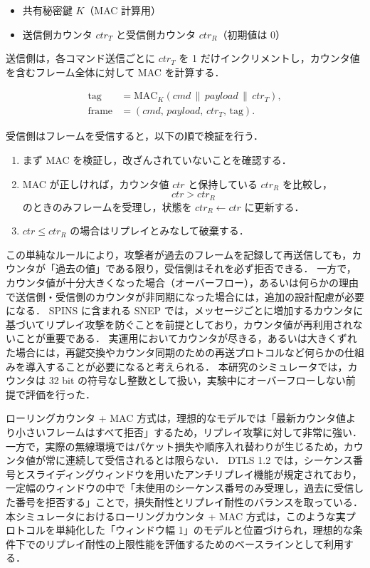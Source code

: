 \documentclass[twocolumn,10pt,a4paper]{jsarticle}
\begin{document}
\begin{itemize}
 \item 共有秘密鍵 $K$（MAC 計算用）
 \item 送信側カウンタ $ctr_T$ と受信側カウンタ $ctr_R$（初期値は 0）
\end{itemize}

送信側は，各コマンド送信ごとに $ctr_T$ を 1 だけインクリメントし，カウンタ値を含むフレーム全体に対して MAC を計算する．

\[
\begin{aligned}
\mathrm{tag} &= \mathrm{MAC}_K(\mathit{cmd} \,\|\, \mathit{payload} \,\|\, ctr_T),\\
\mathrm{frame} &= (\mathit{cmd},\, \mathit{payload},\, ctr_T,\, \mathrm{tag}).
\end{aligned}
\]

受信側はフレームを受信すると，以下の順で検証を行う．

\begin{enumerate}
 \item まず MAC を検証し，改ざんされていないことを確認する．
 \item MAC が正しければ，カウンタ値 $ctr$ と保持している $ctr_R$ を比較し，
       \[
          ctr > ctr_R
       \]
       のときのみフレームを受理し，状態を $ctr_R \leftarrow ctr$ に更新する．
 \item $ctr \le ctr_R$ の場合はリプレイとみなして破棄する．
\end{enumerate}

この単純なルールにより，攻撃者が過去のフレームを記録して再送信しても，カウンタが「過去の値」である限り，受信側はそれを必ず拒否できる．
一方で，カウンタ値が十分大きくなった場合（オーバーフロー），あるいは何らかの理由で送信側・受信側のカウンタが非同期になった場合には，追加の設計配慮が必要になる．
SPINS に含まれる SNEP では，メッセージごとに増加するカウンタに基づいてリプレイ攻撃を防ぐことを前提としており，カウンタ値が再利用されないことが重要である\cite{PerrigSPINS}．
実運用においてカウンタが尽きる，あるいは大きくずれた場合には，再鍵交換やカウンタ同期のための再送プロトコルなど何らかの仕組みを導入することが必要になると考えられる．
本研究のシミュレータでは，カウンタは 32 bit の符号なし整数として扱い，実験中にオーバーフローしない前提で評価を行った．

ローリングカウンタ + MAC 方式は，理想的なモデルでは「最新カウンタ値より小さいフレームはすべて拒否」するため，リプレイ攻撃に対して非常に強い．
一方で，実際の無線環境ではパケット損失や順序入れ替わりが生じるため，カウンタ値が常に連続して受信されるとは限らない．
DTLS 1.2 では，シーケンス番号とスライディングウィンドウを用いたアンチリプレイ機能が規定されており\cite{RFC6347DTLS}，一定幅のウィンドウの中で「未使用のシーケンス番号のみ受理し，過去に受信した番号を拒否する」ことで，損失耐性とリプレイ耐性のバランスを取っている．
本シミュレータにおけるローリングカウンタ + MAC 方式は，このような実プロトコルを単純化した「ウィンドウ幅 1」のモデルと位置づけられ，理想的な条件下でのリプレイ耐性の上限性能を評価するためのベースラインとして利用する．
\end{document}
